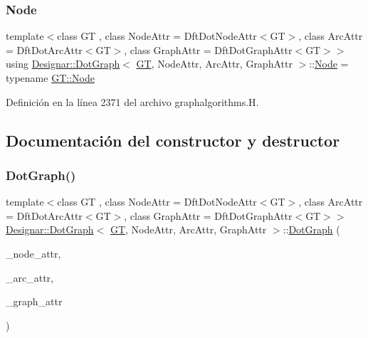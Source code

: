 \subsubsection{\texorpdfstring{Node}{Node}}
{\footnotesize\ttfamily template$<$class GT , class Node\+Attr  = Dft\+Dot\+Node\+Attr$<$\+G\+T$>$, class Arc\+Attr  = Dft\+Dot\+Arc\+Attr$<$\+G\+T$>$, class Graph\+Attr  = Dft\+Dot\+Graph\+Attr$<$\+G\+T$>$$>$ \\
using \hyperlink{class_designar_1_1_dot_graph}{Designar\+::\+Dot\+Graph}$<$ \hyperlink{demo-buildgraph_8_c_a3001c40d2c31ca87ed96cd7d1334a55e}{GT}, Node\+Attr, Arc\+Attr, Graph\+Attr $>$\+::\hyperlink{class_designar_1_1_dot_graph_a591d14a84a622be5bdcc190543c8ca46}{Node} =  typename \hyperlink{class_designar_1_1_graph_a5dfc7dba9d092ac489c72e40390c37d0}{G\+T\+::\+Node}}



Definición en la línea 2371 del archivo graphalgorithms.\+H.



\subsection{Documentación del constructor y destructor}
\mbox{\label{class_designar_1_1_dot_graph_a6173edee577a1311c20f6d6bba5e2673}} 
\subsubsection{\texorpdfstring{Dot\+Graph()}{DotGraph()}\hspace{0.1cm}{\footnotesize\ttfamily [1/2]}}
{\footnotesize\ttfamily template$<$class GT , class Node\+Attr  = Dft\+Dot\+Node\+Attr$<$\+G\+T$>$, class Arc\+Attr  = Dft\+Dot\+Arc\+Attr$<$\+G\+T$>$, class Graph\+Attr  = Dft\+Dot\+Graph\+Attr$<$\+G\+T$>$$>$ \\
\hyperlink{class_designar_1_1_dot_graph}{Designar\+::\+Dot\+Graph}$<$ \hyperlink{demo-buildgraph_8_c_a3001c40d2c31ca87ed96cd7d1334a55e}{GT}, Node\+Attr, Arc\+Attr, Graph\+Attr $>$\+::\hyperlink{class_designar_1_1_dot_graph}{Dot\+Graph} (\begin{DoxyParamCaption}\item[{Node\+Attr \&}]{\+\_\+node\+\_\+attr,  }\item[{Arc\+Attr \&}]{\+\_\+arc\+\_\+attr,  }\item[{Graph\+Attr \&}]{\+\_\+graph\+\_\+attr }\end{DoxyParamCaption})\hspace{0.3cm}{\ttfamily [inline]}}




